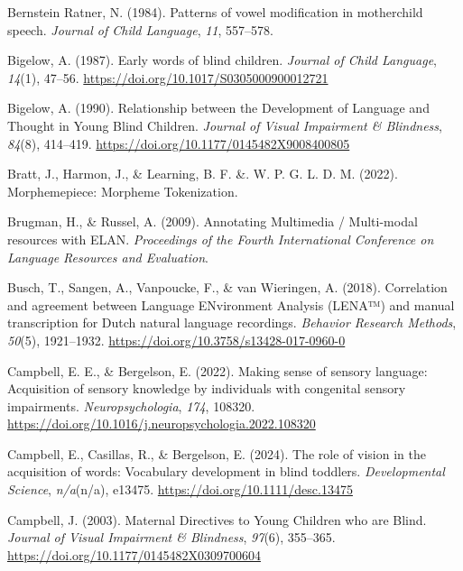 \documentclass[
  man]{apa6}
\newlength{\cslhangindent}
\newlength{\cslentryspacingunit} %
\newenvironment{CSLReferences}[2] %
 {%
  \setlength{\parindent}{0pt}
  \ifodd #1
  \let\oldpar\par
  \def\par{\hangindent=\cslhangindent\oldpar}
  \fi
  \setlength{\parskip}{#2\cslentryspacingunit}
 }%
 {}
\begin{document}
\begin{CSLReferences}{1}{0}
\leavevmode{}%
Bernstein Ratner, N. (1984). Patterns of vowel modification in mother{\textendash}child speech. \emph{Journal of Child Language}, \emph{11}, 557--578.

\leavevmode{}%
Bigelow, A. (1987). Early words of blind children. \emph{Journal of Child Language}, \emph{14}(1), 47--56. \url{https://doi.org/10.1017/S0305000900012721}

\leavevmode{}%
Bigelow, A. (1990). Relationship between the {Development} of {Language} and {Thought} in {Young Blind Children}. \emph{Journal of Visual Impairment \& Blindness}, \emph{84}(8), 414--419. \url{https://doi.org/10.1177/0145482X9008400805}

\leavevmode{}%
Bratt, J., Harmon, J., \& Learning, B. F. \&. W. P. G. L. D. M. (2022). Morphemepiece: {Morpheme Tokenization}.

\leavevmode{}%
Brugman, H., \& Russel, A. (2009). Annotating {Multimedia} / {Multi-modal} resources with {ELAN}. \emph{Proceedings of the Fourth International Conference on Language Resources and Evaluation}.

\leavevmode{}%
Busch, T., Sangen, A., Vanpoucke, F., \& van Wieringen, A. (2018). Correlation and agreement between {Language ENvironment Analysis} ({LENA}™) and manual transcription for {Dutch} natural language recordings. \emph{Behavior Research Methods}, \emph{50}(5), 1921--1932. \url{https://doi.org/10.3758/s13428-017-0960-0}

\leavevmode{}%
Campbell, E. E., \& Bergelson, E. (2022). Making sense of sensory language: {Acquisition} of sensory knowledge by individuals with congenital sensory impairments. \emph{Neuropsychologia}, \emph{174}, 108320. \url{https://doi.org/10.1016/j.neuropsychologia.2022.108320}

\leavevmode{}%
Campbell, E., Casillas, R., \& Bergelson, E. (2024). The role of vision in the acquisition of words: {Vocabulary} development in blind toddlers. \emph{Developmental Science}, \emph{n/a}(n/a), e13475. \url{https://doi.org/10.1111/desc.13475}

\leavevmode{}%
Campbell, J. (2003). Maternal {Directives} to {Young Children} who are {Blind}. \emph{Journal of Visual Impairment \& Blindness}, \emph{97}(6), 355--365. \url{https://doi.org/10.1177/0145482X0309700604}


\end{CSLReferences}
\end{document}
